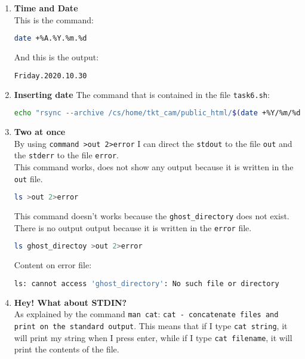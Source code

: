 \documentclass[9pt]{article}
\begin{document}
\begin{enumerate}
	\item \textbf{Time and Date}\\
		This is the command:
		\begin{lstlisting}[language=bash]
date +%A.%Y.%m.%d 
		\end{lstlisting}
		And this is the output:
		\begin{lstlisting}[language=bash]
Friday.2020.10.30
		\end{lstlisting}
		
	\item \textbf{Inserting date}
		The command that is contained in the file \texttt{task6.sh}:
		\begin{lstlisting}[language=bash,breaklines=true]
echo "rsync --archive /cs/home/tkt_cam/public_html/$(date +%Y/%m/%d)/~/ShellScripting2019/Week1/$(date +%A.%Y.%m.%d)"
		\end{lstlisting}
		
	\item \textbf{Two at once}\\
		By using \texttt{command >out 2>error} I can direct the \texttt{stdout} to the file \texttt{out} and the \texttt{stderr} to the file \texttt{error}.\\
		This command works, does not show any output because it is written in the \texttt{out} file.
		\begin{lstlisting}[language=bash]
ls >out 2>error
		\end{lstlisting}
		This command doesn't works because the \texttt{ghost\_directory} does not exist.
		There is no output output because it is written in the \texttt{error} file.
		\begin{lstlisting}[language=bash]
ls ghost_directoy >out 2>error
		\end{lstlisting}
		Content on error file:
		\begin{lstlisting}[language=bash]
ls: cannot access 'ghost_directory': No such file or directory
		\end{lstlisting}
		
	\item \textbf{Hey! What about STDIN?}\\
		As explained by the command \texttt{man cat}: \texttt{cat - concatenate files and print on the standard output}.
		This means that if I type \texttt{cat string}, it will print my string when I press enter, while if I type \texttt{cat filename}, it will print the contents of the file.
	
\end{enumerate}
\end{document}
